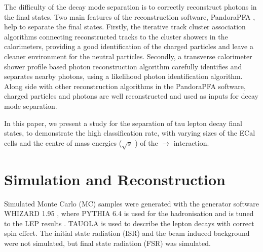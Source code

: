 \documentclass[a4paper,11pt]{article}
\newcommand{\rootS}{\ensuremath{\sqrt{s}} }
\begin{document}




The difficulty of the \PGt decay mode separation is to correctly reconstruct photons in the final states. Two main features of the reconstruction software, PandoraPFA \cite{Marshall:2015rfa}, help to separate the final states. Firstly, the iterative track cluster association algorithms connecting reconstructed tracks to the cluster showers in the calorimeters, providing a good identification of the charged particles and leave a cleaner environment for the neutral particles. Secondly, a transverse calorimeter shower profile based photon reconstruction algorithm carefully identifies and separates nearby photons, using a likelihood photon identification algorithm. Along side with other reconstruction algorithms in the PandoraPFA software, charged particles and photons are well reconstructed and used as inputs for \PGt decay mode separation.

In this paper, we present a study for the separation of tau lepton decay final states, to demonstrate the high classification rate, with varying sizes of the ECal cells and the centre of mass  energies (\rootS) of the \Pem\Pep $\to$ \PGtm\PGtp interaction.


\section{Simulation and Reconstruction}

Simulated Monte Carlo (MC) samples were generated with the generator software WHIZARD 1.95 \cite{whizard}, where PYTHIA 6.4 \cite{Sjostrand:1995iq} is used for the hadronisation and is tuned to the LEP results \cite{}. TAUOLA \cite{Jadach:1993hs} is used to describe the \PGt lepton decays with correct spin effect. The initial state radiation (ISR) and the beam induced background were not simulated, but final state radiation (FSR) was simulated. 
\end{document}
